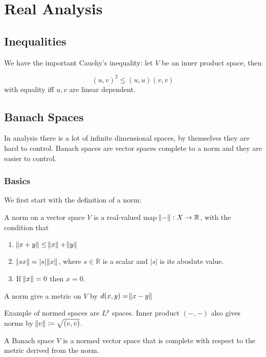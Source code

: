 \documentclass[main.tex]{subfiles}
\begin{document}
\section{Real Analysis}


\subsection{Inequalities}

We have the important Cauchy's inequality:
let $V$ be an inner product space, then 
\begin{theorem}
$$(u,v)^2 \leq (u,u) (v,v)$$
with equality iff $u,v$ are linear dependent.
\end{theorem}

\subsection{Banach Spaces}
In analysis there is a lot of infinite dimensional spaces, by themselves they are hard to control. Banach spaces are vector spaces complete to a norm and they are easier to control. 

\subsubsection{Basics}

We first start with the definition of a norm:

\begin{definition}
A norm on a vector space $V$ is a real-valued map $\norm{-} : X \rightarrow \mathbb{R}$, with the condition that 
\begin{enumerate}
    \item $\norm{x + y} \leq \norm{x} + \norm{y}$
    \item $\norm{s x} = |s| \norm{x}$, where $s \in \mathbb{R}$ is a scalar and $|s|$ is its aboslute value.
    \item If $\norm{x} = 0$ then $x = 0$.
\end{enumerate}

A norm give a metric on $V$ by $d(x, y) = \norm{x -y}$
\end{definition}

\begin{example}
Example of normed spaces are $L^p$ spaces. Inner product $(-,-)$ also gives norms by $\norm{v} \coloneqq \sqrt{(v,v)}$. 
\end{example}


\begin{definition}
A Banach space $V$ is a normed vector space that is complete with respect to the metric derived from the norm.
\end{definition}
\end{document}
